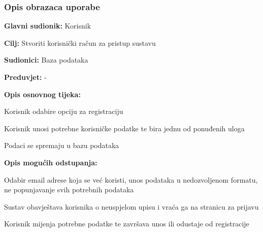 				
				\subsubsection{Opis obrazaca uporabe}
					
					\noindent {}
					\begin{packed_item}
	
						\item \textbf{Glavni sudionik: }Korisnik
						\item  \textbf{Cilj:} Stvoriti korisnički račun za pristup sustavu
						\item  \textbf{Sudionici:} Baza podataka
						\item  \textbf{Preduvjet:} -
						\item  \textbf{Opis osnovnog tijeka:}
						
						\item[] \begin{packed_enum}
	
							\item Korisnik odabire opciju za registraciju
							\item Korisnik unosi potrebne korisničke podatke te bira jednu od ponuđenih uloga
							\item Podaci se spremaju u bazu podataka
														
						\end{packed_enum}
						
						\item  \textbf{Opis mogućih odstupanja:}
						
						\item[] \begin{packed_item}
	
							\item[2.a] Odabir email adrese koja se već koristi, unos podataka u nedozvoljenom formatu, ne popunjavanje svih potrebnih podataka 
							\item[] \begin{packed_enum}
								
								\item Sustav obavještava korisnika o neuspjelom upisu i vraća ga na stranicu za prijavu
								\item Korisnik mijenja potrebne podatke te završava unos ili odustaje od registracije
								
							\end{packed_enum}
						\end{packed_item}
					\end{packed_item}
				

